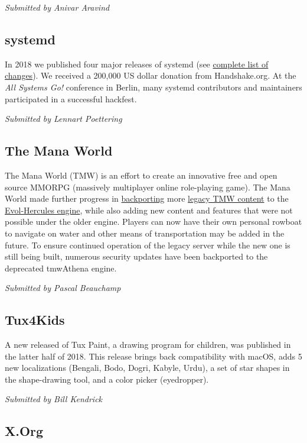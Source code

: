\documentclass[a4paper]{report}
\begin{document}
{\em Submitted by Anivar Aravind}

\subsection{systemd}

In 2018 we published four major releases of systemd (see
\href{https://raw.githubusercontent.com/systemd/systemd/master/NEWS}{complete
list of changes}).  We received a 200,000 US dollar donation from
Handshake.org.  At the {\em All Systems Go!} conference in Berlin, many
systemd contributors and maintainers participated in a successful
hackfest.

{\em Submitted by Lennart Poettering}

\subsection{The Mana World}

The Mana World (TMW) is an effort to create an innovative free and open
source MMORPG (massively multiplayer online role-playing game).  The
Mana World made further progress in
\href{https://gitlab.com/evol/serverdata}{backporting} more
\href{https://github.com/themanaworld/tmwa-server-data}{legacy TMW
content} to the
\href{https://gitlab.com/evol/evol-hercules}{Evol-Hercules engine},
while also adding new content and features that were not possible under
the older engine. Players can now have their own personal rowboat to
navigate on water and other means of transportation may be added in the
future. To ensure continued operation of the legacy server while the new
one is still being built, numerous security updates have been backported
to the deprecated tmwAthena engine.

{\em Submitted by Pascal Beauchamp}

\subsection{Tux4Kids}

A new released of Tux Paint, a drawing program for children, was
published in the latter half of 2018.  This release brings back
compatibility with macOS, adds 5 new localizations (Bengali, Bodo,
Dogri, Kabyle, Urdu), a set of star shapes in the shape-drawing tool,
and a color picker (eyedropper).

{\em Submitted by Bill Kendrick}

\subsection{X.Org}
\end{document}
